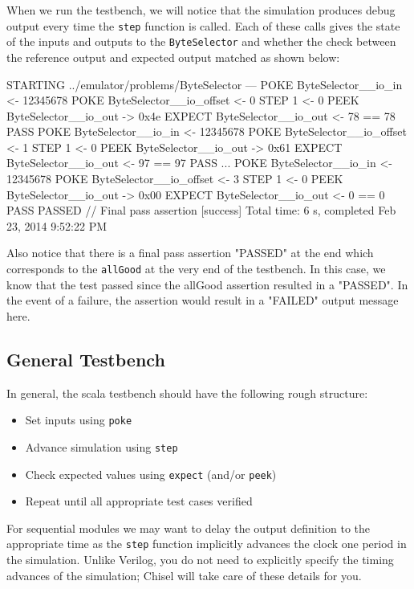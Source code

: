 When we run the testbench, we will notice that the simulation produces debug output every time the \verb+step+ function is called. Each of these calls gives the state of the inputs and outputs to the \verb+ByteSelector+ and whether the check between the reference output and expected output matched as shown below:

\begin{bash}
STARTING ../emulator/problems/ByteSelector
---
POKE ByteSelector__io_in <- 12345678
POKE ByteSelector__io_offset <- 0
STEP 1 <- 0
PEEK ByteSelector__io_out -> 0x4e
EXPECT ByteSelector__io_out <- 78 == 78 PASS
POKE ByteSelector__io_in <- 12345678
POKE ByteSelector__io_offset <- 1
STEP 1 <- 0
PEEK ByteSelector__io_out -> 0x61
EXPECT ByteSelector__io_out <- 97 == 97 PASS
...
POKE ByteSelector__io_in <- 12345678
POKE ByteSelector__io_offset <- 3
STEP 1 <- 0
PEEK ByteSelector__io_out -> 0x00
EXPECT ByteSelector__io_out <- 0 == 0 PASS
PASSED   // Final pass assertion
[success] Total time: 6 s, completed Feb 23, 2014 9:52:22 PM
\end{bash}

Also notice that there is a final pass assertion "PASSED" at the end which corresponds to the \verb+allGood+ at the very end of the testbench. In this case, we know that the test passed since the allGood assertion resulted in a "PASSED". In the event of a failure, the assertion would result in a "FAILED" output message here.

\subsection{General Testbench}

In general, the scala testbench should have the following rough structure:

\begin{itemize}
\item Set inputs using \verb+poke+
\item Advance simulation using \verb+step+
\item Check expected values using \verb+expect+ (and/or \verb+peek+)
\item Repeat until all appropriate test cases verified
\end{itemize}

For sequential modules we may want to delay the output definition to the appropriate time as the \verb+step+ function implicitly advances the clock one period in the simulation. Unlike Verilog, you do not need to explicitly specify the timing advances of the simulation; Chisel will take care of these details for you.

